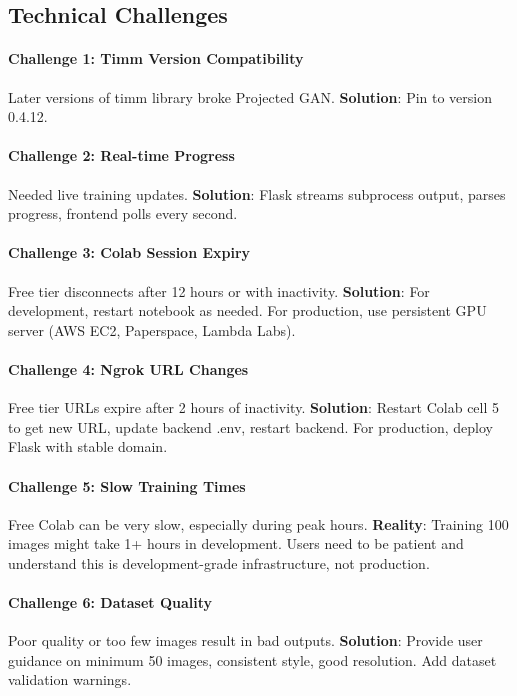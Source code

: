 \documentclass[11pt,a4paper]{article}
\begin{document}
\subsection{Technical Challenges}

\paragraph{Challenge 1: Timm Version Compatibility}
Later versions of timm library broke Projected GAN. \textbf{Solution}: Pin to version 0.4.12.

\paragraph{Challenge 2: Real-time Progress}
Needed live training updates. \textbf{Solution}: Flask streams subprocess output, parses progress, frontend polls every second.

\paragraph{Challenge 3: Colab Session Expiry}
Free tier disconnects after 12 hours or with inactivity. \textbf{Solution}: For development, restart notebook as needed. For production, use persistent GPU server (AWS EC2, Paperspace, Lambda Labs).

\paragraph{Challenge 4: Ngrok URL Changes}
Free tier URLs expire after 2 hours of inactivity. \textbf{Solution}: Restart Colab cell 5 to get new URL, update backend .env, restart backend. For production, deploy Flask with stable domain.

\paragraph{Challenge 5: Slow Training Times}
Free Colab can be very slow, especially during peak hours. \textbf{Reality}: Training 100 images might take 1+ hours in development. Users need to be patient and understand this is development-grade infrastructure, not production.

\paragraph{Challenge 6: Dataset Quality}
Poor quality or too few images result in bad outputs. \textbf{Solution}: Provide user guidance on minimum 50 images, consistent style, good resolution. Add dataset validation warnings.
\end{document}
